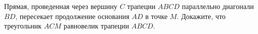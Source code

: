 \begin{ex}
	\begin{condition}
		Прямая, проведенная через вершину \( C  \) трапеции	\( ABCD  \) параллельно диагонали \( BD \), пересекает продолжение основания \( AD  \) в точке \( M \). Докажите, что треугольник \( ACM \)	равновелик трапеции \( ABCD \).
	\end{condition}
\end{ex}